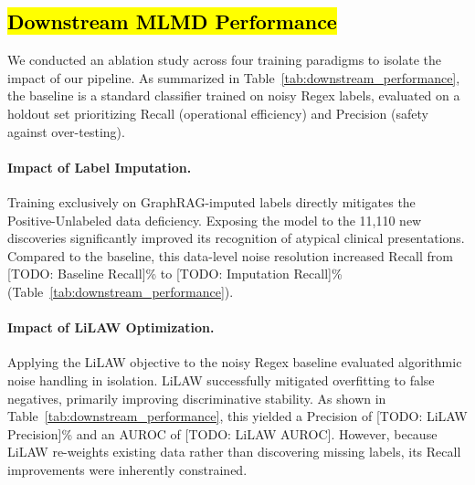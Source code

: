 \documentclass[pmlr]{jmlr}%
\begin{document}
\subsection{\hl{Downstream MLMD Performance}}
We conducted an ablation study across four training paradigms to isolate the impact of our pipeline. As summarized in Table~\ref{tab:downstream_performance}, the baseline is a standard classifier trained on noisy Regex labels, evaluated on a holdout set prioritizing Recall (operational efficiency) and Precision (safety against over-testing).

\begin{table}[htbp]
    \centering
    \caption{Ablation study quantifying downstream MLMD performance across the four training paradigms. Metrics reflect evaluation on the holdout test set.}
    \label{tab:downstream_performance}
\end{table}

\paragraph{Impact of Label Imputation.}
Training exclusively on GraphRAG-imputed labels directly mitigates the Positive-Unlabeled data deficiency. Exposing the model to the 11,110 new discoveries significantly improved its recognition of atypical clinical presentations. Compared to the baseline, this data-level noise resolution increased Recall from [TODO: Baseline Recall]\% to [TODO: Imputation Recall]\% (Table~\ref{tab:downstream_performance}).

\paragraph{Impact of LiLAW Optimization.}
Applying the LiLAW objective to the noisy Regex baseline evaluated algorithmic noise handling in isolation. LiLAW successfully mitigated overfitting to false negatives, primarily improving discriminative stability. As shown in Table~\ref{tab:downstream_performance}, this yielded a Precision of [TODO: LiLAW Precision]\% and an AUROC of [TODO: LiLAW AUROC]. However, because LiLAW re-weights existing data rather than discovering missing labels, its Recall improvements were inherently constrained.
\end{document}
